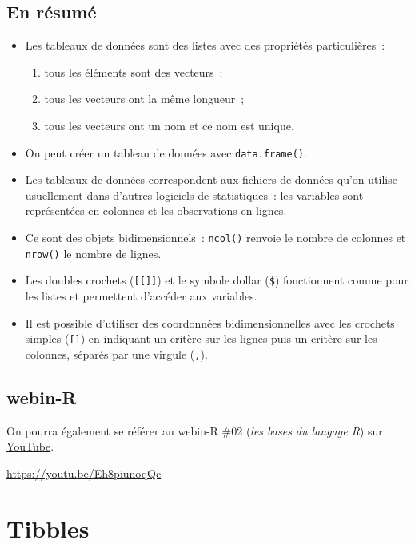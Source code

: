 \documentclass[
  letterpaper,
  DIV=11,
  numbers=noendperiod,
  oneside]{scrreprt}
\providecommand{\tightlist}{%
  \setlength{\itemsep}{0pt}\setlength{\parskip}{0pt}}\usepackage{longtable,booktabs,array}
\begin{document}
\hypertarget{en-ruxe9sumuxe9-2}{%
\section{En résumé}\label{en-ruxe9sumuxe9-2}}

\begin{itemize}
\tightlist
\item
  Les tableaux de données sont des listes avec des propriétés
  particulières~:

  \begin{enumerate}
  \def\labelenumi{\roman{enumi}.}
  \tightlist
  \item
    tous les éléments sont des vecteurs~;
  \item
    tous les vecteurs ont la même longueur~;
  \item
    tous les vecteurs ont un nom et ce nom est unique.
  \end{enumerate}
\item
  On peut créer un tableau de données avec \texttt{data.frame()}.
\item
  Les tableaux de données correspondent aux fichiers de données qu'on
  utilise usuellement dans d'autres logiciels de statistiques~: les
  variables sont représentées en colonnes et les observations en lignes.
\item
  Ce sont des objets bidimensionnels~: \texttt{ncol()} renvoie le nombre
  de colonnes et \texttt{nrow()} le nombre de lignes.
\item
  Les doubles crochets (\texttt{{[}{[}{]}{]}}) et le symbole dollar
  (\texttt{\$}) fonctionnent comme pour les listes et permettent
  d'accéder aux variables.
\item
  Il est possible d'utiliser des coordonnées bidimensionnelles avec les
  crochets simples (\texttt{{[}{]}}) en indiquant un critère sur les
  lignes puis un critère sur les colonnes, séparés par une virgule
  (\texttt{,}).
\end{itemize}

\hypertarget{webin-r-2}{%
\section{webin-R}\label{webin-r-2}}

On pourra également se référer au webin-R \#02 (\emph{les bases du
langage R}) sur \href{https://youtu.be/Eh8piunoqQc}{YouTube}.

\url{https://youtu.be/Eh8piunoqQc}

\hypertarget{sec-tibbles}{%
\chapter{Tibbles}\label{sec-tibbles}}
\end{document}
